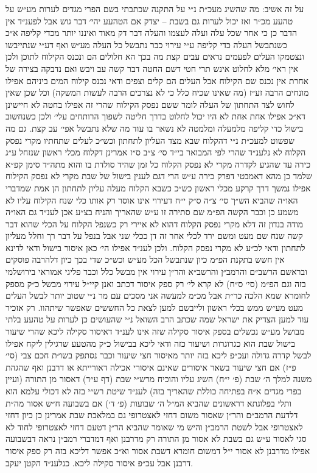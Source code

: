 \documentclass[12pt, openany]{book}
\begin{document}
\begin{multicols}{2}
על זה אשיב: מה שהשיג מעכ״ת נ״י על התקנה שכתבתי בשם הפרי מגדים לערות מע״ש על טהעע מכ״ר ואז יכול לערות גם בשבת – יצדק אם הטהעע יהי׳ דבר גוש אבל לפענ״ד אין הדבר כן כי אחר שכל עלה ועלה לעצמו והעלה דבר דק מאוד ואיננו יותר מכדי קליפה א״כ כשנתבשל העלה כדי קליפה ע״י עירוי כבר נתבשל כל העלה מע״ש ואף דע״י שנתייבשו ונצטמקו העלים לפעמים נראים עבים קצת מה בכך הא חלולים הם ונכנס הקילוח לתוכן ולכן אין ראי׳ מלא לחלוט אינש תרי חטי דשם החטה דבר קשה עב ויבש ואם נדבקה בצירה של אחרת אין נכנס שם הקילוח אבל העלים הם קלים וצפים ודאי נכנס קילוח המים ביניהם אפילו מונחים הרבה זע״ז (מה שאינו שכיח כלל כי לא נצרכים הרבה לעשות המשקה) וכל שכן שאין לחוש לצד התחתון של העלה לומר ששם נפסק הקילוח שהרי זה אפילו בחטה לא חיישינן דא״כ אפילו אחת אחת לא היו יכול לחלוט בדרך חליטה לשפוך הרותחים עלי׳ ולכן כשנחשוב בישול כדי קליפה מלמעלה ומלמטה לא נשאר בו עוד מה שלא נתבשל אפי׳ עב קצת. גם מה שפשוט למעכ״ת נ״י דהקלוח שבא מצד העליון לתחתון וכש״כ לעלים שתחתיו מקרי נפסק הקלוח לא נלענ״ד שהרי לפי המבואר בי״ד סי׳ צ״ב ס״ז אמרינן דקלוח מכלי ראשון שנזחל ע״ג כירה עד שהגיע לקדרה מקרי לא נפסק הקלוח כל זמן שהיד סולדת בו והוא מתה״ד סימן קפ״א שלמד כן מהא דאמבטי דפרק כירה ע״ש הרי דגם לענין בישול של שבת מקרי לא נפסק הקילוח אפילו נמשך דרך קרקע מכלי ראשון כש״כ כשבא הקלוח מעלה עליון לתחתון הן אמת שמדברי האו״ה שהביא הש״ך סי׳ צ״ה ס״ק י״ח דעירוי אינו אוסר רק אותו כלי שנח הקילוח עליו לא משמע כן וכבר הקשה הפ״מ שם סתירה זו ע״ש שהאריך והניח בצ״ע אכן לענ״ד גם האו״ה מודה בנדון זה דלא מקרי נפסק הקלוח דהוא לא איירי רק כשנפל הקלוח על הכלי שהוא דבר קשה שנח שם מעט ומשם ירד לכלי אחר זה דן ככלי שני אבל בנפל על דבר רך וחלל מעליון לתחתון ודאי לכ״ע לא מקרי נפסק הקלוח. ולכן לענ״ד אפילו הי׳ כאן איסור בישול ודאי לדינא אין חשש בתקנת הפ״מ כיון שנתבשל הכל מע״ש וכש״כ שדי בכך כיון דלהרבה פוסקים ובראשם הרשב״ם והרמב״ן והרשב״א והר״ן עירוי אין מבשל כלל וכבר פליגי אמוראי בירושלמי בזה וגם הפ״מ (סי׳ ס״ח) לא קרא לי׳ רק ספק איסור דכתב ואנן קיי״ל עירוי מבשל כ״ק מספק לחומרא שמא הלכה כר״ת אבל מכ״מ למעשה אני מסכים עם מר נ״י שטוב יותר לבשל העלים מעט מע״ש ממש בכלי ראשון ולייבשם למען לצאת כל החששים שאפשר שיתהוו. רק אזכיר עוד למען הצדיק את ישראל שמה שכתב הרב השואל נ״י שהעושים כן לערות על טהעע בלתי מבושל מע״ש נכשלים בספק איסור סקילה שזה אינו לענ״ד דאיסור סקילה ליכא שהרי שיעור בישול שבת הוא כגרוגרות ושיעור כזה ודאי ליכא בבישול כ״ק מהטעע שרגילין ליקח אפילו לבשל קדרה גדולה ועכ״פ ליכא בזה יותר מאיסור חצי שיעור וכבר נסתפק בשו״ת חכם צבי (סי׳ פ״ז) אם חצי שיעור בשאר איסורים שאינם איסורי אכילה דאורייתא או דרבנן ואף שהגהת משנה למלך ה׳ שבת (פ׳ י״ח) השיג עליו והוכיח מרש״י שבת (דף ע״ד) דאסור מן התורה (ועיין בפרי מגדים א״ח בפתיחה כוללת שהאריך בזה) לענ״ד שיטת רש״י בזה לא דכולי עלמא הוא ותלי בפלוגתא דראשונים שהביא המ״ל ה׳ שבועות (פ׳ ד׳) אם בשבועה ח״ש אסור מה״ת דלדעת הרמב״ם והר״ן שאסור משום דחזי לאצטרופי גם במלאכת שבת אמרינן כן כיון דחזי לאצטרופי אבל לשטת הרמב״ן והיש מי שאומר שהביא הר״ן דטעם דחזי לאצטרופי לחוד לא סגי לאסור ע״ש גם בשבת לא אסור מן התורה רק מדרבנן ואף דמדברי רמב״ן נראה דבשבועה אפילו מדרבנן לא אסור י״ל דמשום חומרא דשבת אסור וא״כ אפשר דליכא בזה רק ספק איסור דרבנן אבל עכ״פ איסור סקילה ליכא. כנלענ״ד הקטן יעקב.\\\vspace{0pt}

\end{multicols}\newpage
\end{document}
